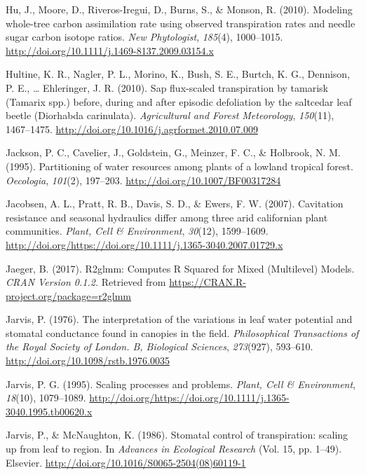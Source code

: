 \documentclass[11pt,twoside]{reedthesis}
\begin{document}
\hypertarget{ref-Hu2010}{}
Hu, J., Moore, D., Riveros-Iregui, D., Burns, S., \& Monson, R. (2010).
Modeling whole-tree carbon assimilation rate using observed
transpiration rates and needle sugar carbon isotope ratios. \emph{New
Phytologist}, \emph{185}(4), 1000--1015.
\url{http://doi.org/10.1111/j.1469-8137.2009.03154.x}

\hypertarget{ref-Hultine2010}{}
Hultine, K. R., Nagler, P. L., Morino, K., Bush, S. E., Burtch, K. G.,
Dennison, P. E., \ldots{} Ehleringer, J. R. (2010). Sap flux-scaled
transpiration by tamarisk (Tamarix spp.) before, during and after
episodic defoliation by the saltcedar leaf beetle (Diorhabda
carinulata). \emph{Agricultural and Forest Meteorology}, \emph{150}(11),
1467--1475. \url{http://doi.org/10.1016/j.agrformet.2010.07.009}

\hypertarget{ref-jackson_partitioning_1995}{}
Jackson, P. C., Cavelier, J., Goldstein, G., Meinzer, F. C., \&
Holbrook, N. M. (1995). Partitioning of water resources among plants of
a lowland tropical forest. \emph{Oecologia}, \emph{101}(2), 197--203.
\url{http://doi.org/10.1007/BF00317284}

\hypertarget{ref-Jacobsen2007}{}
Jacobsen, A. L., Pratt, R. B., Davis, S. D., \& Ewers, F. W. (2007).
Cavitation resistance and seasonal hydraulics differ among three arid
californian plant communities. \emph{Plant, Cell \& Environment},
\emph{30}(12), 1599--1609.
\url{http://doi.org/https://doi.org/10.1111/j.1365-3040.2007.01729.x}

\hypertarget{ref-jaeger_r2glmm_2017}{}
Jaeger, B. (2017). R2glmm: Computes R Squared for Mixed (Multilevel)
Models. \emph{CRAN Version 0.1.2.} Retrieved from
\url{https://CRAN.R-project.org/package=r2glmm}

\hypertarget{ref-jarvis_interpretation_1976}{}
Jarvis, P. (1976). The interpretation of the variations in leaf water
potential and stomatal conductance found in canopies in the field.
\emph{Philosophical Transactions of the Royal Society of London. B,
Biological Sciences}, \emph{273}(927), 593--610.
\url{http://doi.org/10.1098/rstb.1976.0035}

\hypertarget{ref-Jarvis1995}{}
Jarvis, P. G. (1995). Scaling processes and problems. \emph{Plant, Cell
\& Environment}, \emph{18}(10), 1079--1089.
\url{http://doi.org/https://doi.org/10.1111/j.1365-3040.1995.tb00620.x}

\hypertarget{ref-jarvis_stomatal_1986}{}
Jarvis, P., \& McNaughton, K. (1986). Stomatal control of transpiration:
scaling up from leaf to region. In \emph{Advances in Ecological
Research} (Vol. 15, pp. 1--49). Elsevier.
\url{http://doi.org/10.1016/S0065-2504(08)60119-1}
\end{document}
